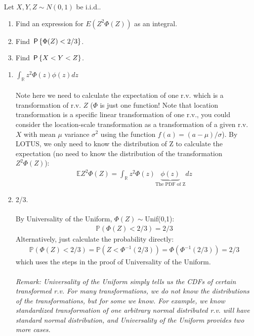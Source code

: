 

\setcounter{theorem}{55}
\begin{exercise}[BH.5.56] Let $X,Y,Z \sim N(0,1)$ be i.i.d..
	\begin{enumerate}
		\item Find an expression for $E(Z^2 \Phi(Z))$ as an integral.
		\item Find $\P{\Phi(Z) < 2 / 3}$.
		\item Find $\P{X < Y < Z}$.
	\end{enumerate}
\begin{solution}
    \begin{enumerate}
	    \item $\int_{\mathbb{R}}z^2\Phi(z)\phi(z)dz $~\\~\\
    	Note here we need to calculate the expectation of one r.v. which is a transformation of r.v. $Z$ ($\Phi$ is just one function! Note that location transformation is a specific linear transformation of one r.v., you could consider the location-scale transformation as a transformation of a given r.v. $X$ with mean $\mu$ variance $\sigma^2$ using the function $f(a)=(a-\mu)/\sigma$).	
    	By LOTUS, we only need to know the distribution of Z to calculate the expectation (no need to know the distribution of the transformation $Z^2\Phi(Z)$):
    	\begin{align*}
    		\mathbb{E}Z^2\Phi(Z) = \int_{\mathbb{R}}z^2\Phi(z) \underbrace{\phi(z)}_{\text{The PDF of Z}}dz
    	\end{align*}
    	\item 2/3.\\~\\
    	By Universality of the Uniform, $\Phi(Z)\sim$Unif(0,1):
    	\begin{align*}
    		\mathbb{P}\left(\Phi(Z) < 2/3 \right)=2/3
    	\end{align*}
    	Alternatively, just calculate the probability directly:
    	\begin{align*}
    		\mathbb{P}\left(\Phi(Z) < 2/3 \right)=\mathbb{P}\left(Z < \Phi^{-1}(2/3) \right)=\Phi\left( \Phi^{-1}(2/3) \right) = 2/3
    	\end{align*}
    	which uses the steps in the proof of Universality of the Uniform. 
    	~\\~~\\
    	\textit{Remark: Universality of the Uniform simply tells us the CDFs of certain transformed r.v. For many transformations, we do not know the distributions of the transformations, but for some we know. For example, we know standardized transformation of one arbitrary normal distributed r.v. will have standard normal distribution, and  Universality of the Uniform provides two more cases.}

\end{enumerate}
\end{solution}
\end{exercise}
